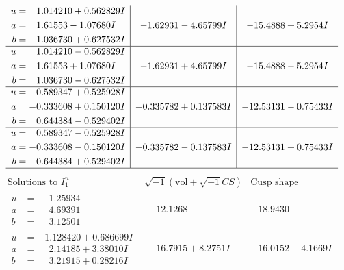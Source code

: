 \documentclass[1p]{elsarticle_modified}
\theoremstyle{definition}
\newcommand{\I}{\sqrt{-1}}
\begin{document}
$$\begin{array}{c|c|c}
\begin{aligned}
u &= \phantom{-}1.014210 + 0.562829 I \\
a &= \phantom{-}1.61553 - 1.07680 I \\
b &= \phantom{-}1.036730 + 0.627532 I\end{aligned}
 & -1.62931 - 4.65799 I & -15.4888 + 5.2954 I \\ \hline\begin{aligned}
u &= \phantom{-}1.014210 - 0.562829 I \\
a &= \phantom{-}1.61553 + 1.07680 I \\
b &= \phantom{-}1.036730 - 0.627532 I\end{aligned}
 & -1.62931 + 4.65799 I & -15.4888 - 5.2954 I \\ \hline\begin{aligned}
u &= \phantom{-}0.589347 + 0.525928 I \\
a &= -0.333608 + 0.150120 I \\
b &= \phantom{-}0.644384 - 0.529402 I\end{aligned}
 & -0.335782 + 0.137583 I & -12.53131 - 0.75433 I \\ \hline\begin{aligned}
u &= \phantom{-}0.589347 - 0.525928 I \\
a &= -0.333608 - 0.150120 I \\
b &= \phantom{-}0.644384 + 0.529402 I\end{aligned}
 & -0.335782 - 0.137583 I & -12.53131 + 0.75433 I\\
 \hline 
 \end{array}$$\newpage$$\begin{array}{c|c|c}  
\text{Solutions to }I^u_{1}& \I (\text{vol} + \sqrt{-1}CS) & \text{Cusp shape}\\
 \hline 
\begin{aligned}
u &= \phantom{-}1.25934\phantom{ +0.000000I} \\
a &= \phantom{-}4.69391\phantom{ +0.000000I} \\
b &= \phantom{-}3.12501\phantom{ +0.000000I}\end{aligned}
 & \phantom{-}12.1268\phantom{ +0.000000I} & -18.9430\phantom{ +0.000000I} \\ \hline\begin{aligned}
u &= -1.128420 + 0.686699 I \\
a &= \phantom{-}2.14185 + 3.38010 I \\
b &= \phantom{-}3.21915 + 0.28216 I\end{aligned}
 & \phantom{-}16.7915 + 8.2751 I & -16.0152 - 4.1669 I \\ \hline\begin{aligned}

\end{aligned}
\end{array}$$
\end{document}
